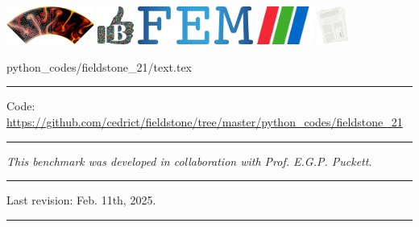 \noindent
\includegraphics[height=1.25cm]{images/pictograms/aspect_logo}
\includegraphics[height=1.25cm]{images/pictograms/benchmark}
\includegraphics[height=1.25cm]{images/pictograms/FEM}
\includegraphics[height=1.25cm]{images/pictograms/paraview}
\includegraphics[height=1.25cm]{images/pictograms/publication}


\begin{flushright} {\tiny {\color{gray} python\_codes/fieldstone\_21/text.tex}} \end{flushright}

\par\noindent\rule{\textwidth}{0.4pt}

\begin{center}
\inpython
{\small Code: \url{https://github.com/cedrict/fieldstone/tree/master/python_codes/fieldstone_21}}
\end{center}

\par\noindent\rule{\textwidth}{0.4pt}

{\sl This benchmark was developed in collaboration with Prof. E.G.P. Puckett}. 

\par\noindent\rule{\textwidth}{0.4pt}

Last revision: Feb. 11th, 2025.

\par\noindent\rule{\textwidth}{0.4pt}


